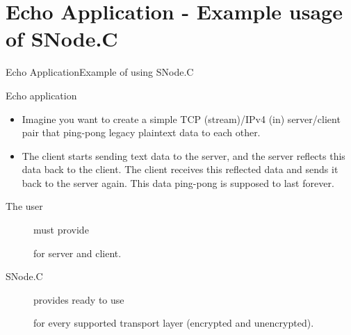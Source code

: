 ﻿\withsectionpage
\section{Echo Application - Example usage of SNode.C}
\nosectionpage

\begin{frame}{\alert{Echo} Application}{Example of using SNode.C}
   \begin{block}{Echo application}
   \begin{itemize}
   \item Imagine you want to create a simple TCP (stream)/IPv4 (in) server/client pair that ping-pong legacy plaintext data to each other.
   \item The client starts sending text data to the server, and the server reflects this data back to the client. The client receives this reflected data and sends it back to the server again. This data ping-pong is supposed to last forever.
   \end{itemize}
\end{block}
   \begin{description}
     \item [The user] must provide
     for server and client.
     \item [SNode.C] provides \alert{ready to use}
     for every supported transport layer (encrypted and unencrypted).
   \end{description}
\end{frame}
